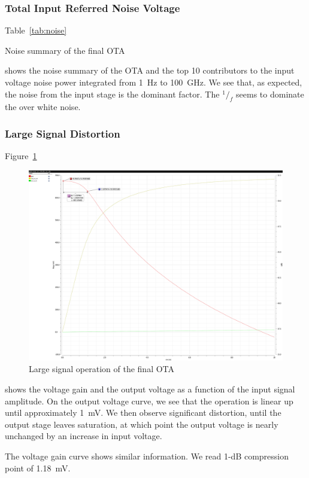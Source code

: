 \documentclass[english,10pt]{article}
\begin{document}
\subsubsection{Total Input Referred Noise Voltage}
Table~\ref{tab:noise}
\begin{table}[htbp]
  \centering
  \begin{minipage}{10cm}
  
  \caption{Noise summary of the final OTA\label{tab:noise}}
  \end{minipage}
\end{table}
shows the noise summary of the OTA and the top 10 contributors to the input voltage noise power integrated from \SI{1}{\hertz} to \SI{100}{\giga\hertz}. We see that, as expected, the noise from the input stage is the dominant factor. The $^1/_f$ seems to dominate the over white noise.

\subsubsection{Large Signal Distortion}
Figure~\ref{fig:large}
\begin{figure}[htbp]
  \centering
  \includegraphics[width = \textwidth]{noise_3.pdf}
  \caption{Large signal operation of the final OTA\label{fig:large}}
\end{figure}
shows the voltage gain and the output voltage as a function of the input signal amplitude. On the output voltage curve, we see that the operation is linear up until approximately \SI{1}{\milli\volt}. We then observe significant distortion, until the output stage leaves saturation, at which point the output voltage is nearly unchanged by an increase in input voltage.

The voltage gain curve shows similar information. We read 1-dB compression point of \SI{1.18}{\milli\volt}.
\end{document}
